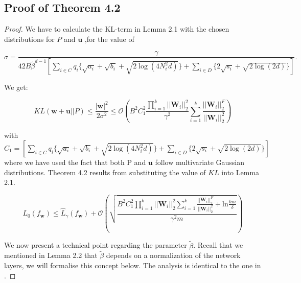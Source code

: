 \documentclass{article} %
\theoremstyle{definition}
\begin{document}
\subsection{Proof of Theorem 4.2}

\begin{proof}
We have to calculate the KL-term in Lemma 2.1 with the chosen distributions for $P$ and $\boldsymbol{u}$ ,for the value of 

\begin{equation}
\sigma  = \frac{\gamma}{42 B \tilde{\beta}^{d-1} [\sum_{i \in C} q_i \{\sqrt{a_i}+\sqrt{b_i}+\sqrt{2\log(4N_i^2d)} \} + \sum_{i \in D} \{2\sqrt{s_i}+\sqrt{2\log(2d)} \}]}. 
\end{equation}

We get:

\begin{equation}
KL(\boldsymbol{w}+\boldsymbol{u}||P) \leq \frac{|\boldsymbol{w}|^2}{2 \sigma^2} \leq \mathcal{O}(B^2 C_1^2 \frac { \prod_{i=1}^{k} ||\boldsymbol{W}_i||_2^2 }{ \gamma^2  } \sum_{i=1}^k \frac{||\boldsymbol{W}_i||_2^F}{||\boldsymbol{W}_i||_2^2} )
\end{equation}

with $C_1 = [\sum_{i \in C} q_i \{\sqrt{a_i}+\sqrt{b_i}+\sqrt{2\log(4N_i^2d)} \} + \sum_{i \in D} \{2\sqrt{s_i}+\sqrt{2\log(2d)} \}]$ where we have used the fact that both P and $\boldsymbol{u}$ follow multivariate Gaussian distributions. Theorem 4.2 results from substituting the value of $KL$ into Lemma 2.1. 

\begin{equation}
L_0(f_{\boldsymbol{w}}) \leq \hat{L}_{\gamma}(f_{\boldsymbol{w}})+\mathcal{O}(\sqrt{\frac{B^2 C_1^2 \prod_{i=1}^{k} ||\boldsymbol{W}_i||_2^2 \sum_{i=1}^k \frac{||\boldsymbol{W}_i||_2^F}{||\boldsymbol{W}_i||_2^2} +\text{ln} \frac{k m }{\delta} }{ \gamma^2 m  }}) 
\end{equation}

We now present a technical point regarding the parameter $\tilde{\beta}$. Recall that we mentioned in Lemma 2.2 that $\tilde{\beta}$ depends on a normalization of the network layers, we will formalise this concept below. The analysis is identical to the one in \citet{neyshabur2017pac}. 


\end{proof}
\end{document}
